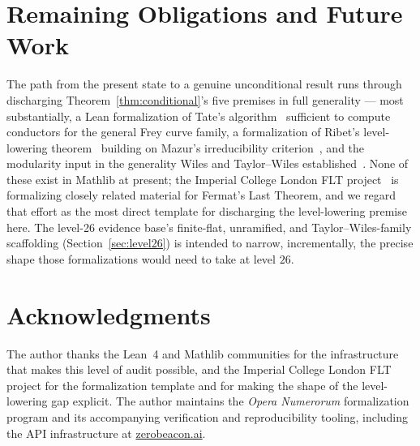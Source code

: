 \documentclass{amsart}
\begin{document}
\section{Remaining Obligations and Future Work}

The path from the present state to a genuine unconditional result runs
through discharging Theorem~\ref{thm:conditional}'s five premises in full
generality — most substantially, a Lean formalization of Tate's
algorithm~\cite{tate1975} sufficient to compute conductors for the general
Frey curve family, a formalization of Ribet's level-lowering
theorem~\cite{ribet1990} building on Mazur's irreducibility
criterion~\cite{mazur1978}, and the modularity input in the generality
Wiles and Taylor--Wiles established~\cite{wiles1995,taylorwiles1995}. None
of these exist in Mathlib at present; the Imperial College London FLT
project~\cite{flt2024} is formalizing closely related material for
Fermat's Last Theorem, and we regard that effort as the most direct
template for discharging the level-lowering premise here. The
level-26 evidence base's finite-flat, unramified, and Taylor--Wiles-family
scaffolding (Section~\ref{sec:level26}) is intended to narrow, incrementally,
the precise shape those formalizations would need to take at level $26$.

\section*{Acknowledgments}
The author thanks the Lean~4 and Mathlib communities for the
infrastructure that makes this level of audit possible, and the Imperial
College London FLT project for the formalization template and for making
the shape of the level-lowering gap explicit. The author maintains the
\textit{Opera Numerorum} formalization program and its accompanying
verification and reproducibility tooling, including the API
infrastructure at \href{https://zerobeacon.ai}{zerobeacon.ai}.
\end{document}
